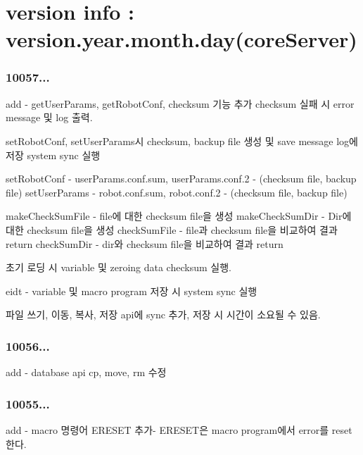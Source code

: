 \section*{version info \-: version.\-year.\-month.\-day(core\-Server)}

\subsubsection*{10057...}

\begin{DoxyVerb}     add - getUserParams, getRobotConf, checksum 기능 추가
           checksum 실패 시 error message 및 log 출력.

           setRobotConf, setUserParams시
           checksum, backup file 생성 및 save message log에 저장
           system sync 실행

           setRobotConf - userParams.conf.sum, userParams.conf.2 - (checksum file, backup file)
           setUserParams - robot.conf.sum, robot.conf.2 - (checksum file, backup file)

           makeCheckSumFile - file에 대한 checksum file을 생성
           makeCheckSumDir - Dir에 대한 checksum file을 생성
           checkSumFile - file과 checksum file을 비교하여 결과 return
           checkSumDir - dir와 checksum file을 비교하여 결과 return

           초기 로딩 시 variable 및 zeroing data checksum 실행.

     eidt - variable 및 macro program 저장 시 system sync 실행

            파일 쓰기, 이동, 복사, 저장 api에 sync 추가, 저장 시 시간이 소요될 수 있음.
\end{DoxyVerb}


\subsubsection*{10056...}

\begin{DoxyVerb}     add -  database api cp, move, rm 수정
\end{DoxyVerb}


\subsubsection*{10055...}

\begin{DoxyVerb}     add -  macro 명령어 ERESET 추가- ERESET은 macro program에서 error를 reset 한다.
\end{DoxyVerb}


